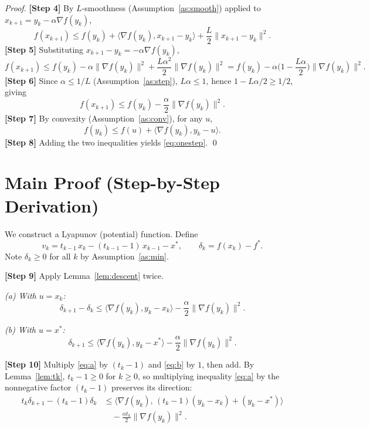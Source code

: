 \documentclass{article}
\begin{document}
\begin{proof}
\textbf{[Step 4]} By $L$-smoothness (Assumption~\ref{as:smooth}) applied to
$x_{k+1} = y_k - \alpha\nabla f(y_k)$,
\[
f(x_{k+1}) \le f(y_k) + \langle \nabla f(y_k), x_{k+1}-y_k\rangle
+ \frac{L}{2}\|x_{k+1}-y_k\|^2.
\]
\textbf{[Step 5]} Substituting $x_{k+1}-y_k = -\alpha\nabla f(y_k)$,
\[
f(x_{k+1}) \le f(y_k) - \alpha\|\nabla f(y_k)\|^2
+ \frac{L\alpha^2}{2}\|\nabla f(y_k)\|^2
= f(y_k) - \alpha\Big(1 - \frac{L\alpha}{2}\Big)\|\nabla f(y_k)\|^2.
\]
\textbf{[Step 6]} Since $\alpha \le 1/L$ (Assumption~\ref{as:step}),
$L\alpha \le 1$, hence $1 - L\alpha/2 \ge 1/2$, giving
\[
f(x_{k+1}) \le f(y_k) - \frac{\alpha}{2}\|\nabla f(y_k)\|^2.
\]
\textbf{[Step 7]} By convexity (Assumption~\ref{as:conv}), for any $u$,
\[
f(y_k) \le f(u) + \langle \nabla f(y_k), y_k - u\rangle.
\]
\textbf{[Step 8]} Adding the two inequalities yields \eqref{eq:onestep}. \qed
\end{proof}

\section*{Main Proof (Step-by-Step Derivation)}

We construct a Lyapunov (potential) function. Define
\begin{equation}
v_k = t_{k-1}\, x_k - (t_{k-1}-1)\, x_{k-1} - x^*, \qquad
\delta_k = f(x_k) - f^*. \label{eq:vk}
\end{equation}
Note $\delta_k \ge 0$ for all $k$ by Assumption~\ref{as:min}.

\textbf{[Step 9]} Apply Lemma~\ref{lem:descent} twice.

\emph{(a) With $u = x_k$:}
\begin{equation}
\delta_{k+1} - \delta_k
\le \langle \nabla f(y_k), y_k - x_k\rangle
- \frac{\alpha}{2}\|\nabla f(y_k)\|^2. \label{eq:a}
\end{equation}

\emph{(b) With $u = x^*$:}
\begin{equation}
\delta_{k+1}
\le \langle \nabla f(y_k), y_k - x^*\rangle
- \frac{\alpha}{2}\|\nabla f(y_k)\|^2. \label{eq:b}
\end{equation}

\textbf{[Step 10]} Multiply \eqref{eq:a} by $(t_k - 1)$ and \eqref{eq:b} by $1$,
then add. By Lemma~\ref{lem:tk}, $t_k - 1 \ge 0$ for $k \ge 0$, so multiplying
inequality \eqref{eq:a} by the nonnegative factor $(t_k-1)$ preserves its
direction:
\begin{align}
t_k \delta_{k+1} - (t_k-1)\delta_k
&\le \big\langle \nabla f(y_k),\, (t_k-1)(y_k-x_k) + (y_k - x^*)\big\rangle
\nonumber\\
&\quad - \frac{\alpha t_k}{2}\|\nabla f(y_k)\|^2. \label{eq:c}
\end{align}
\end{document}
